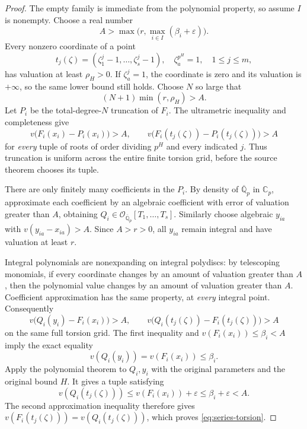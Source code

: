 \begin{proof}
The empty family is immediate from the polynomial property, so assume $I$ is
nonempty.  Choose a real number
\[
 A>\max\bigl(r,\max_{i\in I}(\beta_i+\varepsilon)\bigr).
\]
Every nonzero coordinate of a point
\[
 t_j(\zeta)=(\zeta_1^j-1,\ldots,\zeta_s^j-1),\quad
 \zeta_a^{p^H}=1,\quad1\leq j\leq m,
\]
has valuation at least $\rho_H>0$.  If $\zeta_a^j=1$, the coordinate is zero
and its valuation is $+\infty$, so the same lower bound still holds.  Choose
$N$ so large that
\[
 (N+1)\min(r,\rho_H)>A.
\]
Let $P_i$ be the total-degree-$N$ truncation of $F_i$.  The ultrametric
inequality and completeness give
\begin{equation}
 v\bigl(F_i(x_i)-P_i(x_i)\bigr)>A,\qquad
 v\bigl(F_i(t_j(\zeta))-P_i(t_j(\zeta))\bigr)>A
 \label{eq:uniform-series-tail}
\end{equation}
for \emph{every} tuple of roots of order dividing $p^H$ and every indicated
$j$.  Thus truncation is uniform across the entire finite torsion grid,
before the source theorem chooses its tuple.

There are only finitely many coefficients in the $P_i$.  By density of
$\overline{\mathbb Q}_p$ in $\mathbb C_p$, approximate each coefficient by
an algebraic coefficient with error of valuation greater than $A$, obtaining
$Q_i\in\mathcal O_{\overline{\mathbb Q}_p}[T_1,\ldots,T_s]$.
Similarly choose algebraic $y_{ia}$ with
$v(y_{ia}-x_{ia})>A$.  Since $A>r>0$, all $y_{ia}$ remain integral and have
valuation at least $r$.

Integral polynomials are nonexpanding on integral polydiscs: by telescoping
monomials, if every coordinate changes by an amount of valuation greater
than $A$, then the polynomial value changes by an amount of valuation
greater than $A$.  Coefficient approximation has the same property, at
\emph{every} integral point.  Consequently
\[
 v\bigl(Q_i(y_i)-F_i(x_i)\bigr)>A,\qquad
 v\bigl(Q_i(t_j(\zeta))-F_i(t_j(\zeta))\bigr)>A
\]
on the same full torsion grid.  The first inequality and
$v(F_i(x_i))\leq\beta_i<A$ imply the exact equality
\[
 v(Q_i(y_i))=v(F_i(x_i))\leq\beta_i.
\]
Apply the polynomial theorem to $Q_i,y_i$ with the original parameters
and the original bound $H$.  It gives a tuple satisfying
\[
 v(Q_i(t_j(\zeta)))\leq v(F_i(x_i))+\varepsilon
 \leq\beta_i+\varepsilon<A.
\]
The second approximation inequality therefore gives
$v(F_i(t_j(\zeta)))=v(Q_i(t_j(\zeta)))$, which proves
\eqref{eq:series-torsion}.
\end{proof}

